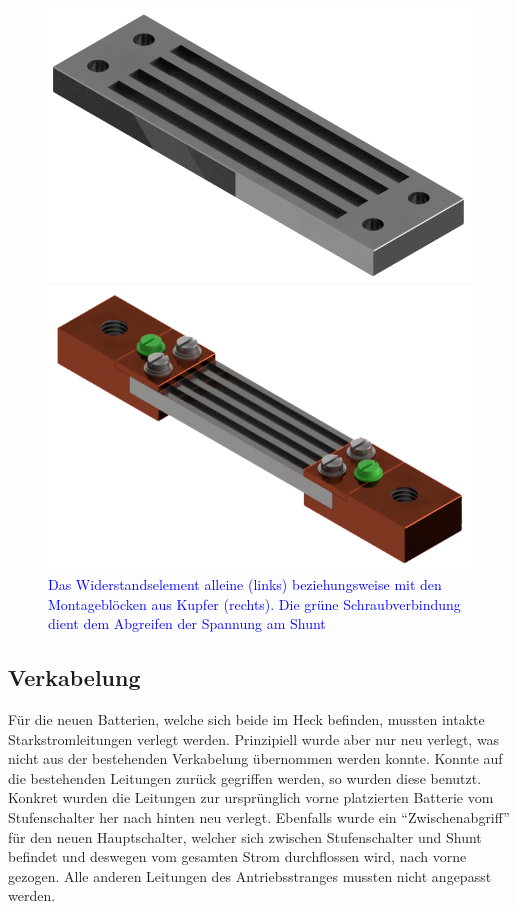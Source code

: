 \begin{figure}[h!]
\begin{minipage}{0.49\textwidth}
\includegraphics[width=\textwidth]{images/Shunt.png}
\end{minipage}\begin{minipage}{0.49\textwidth}
\includegraphics[width=\textwidth]{images/Shunt_komplett.png}
\end{minipage}
\caption{\textcolor{blue}{Das Widerstandselement alleine (links) beziehungsweise mit den Montageblöcken aus Kupfer (rechts). Die grüne Schraubverbindung dient dem Abgreifen der Spannung am Shunt}}%
\label{fig:shunt}%
\end{figure}

\subsection{Verkabelung}
Für die neuen Batterien, welche sich beide im Heck befinden, mussten intakte Starkstromleitungen verlegt werden. Prinzipiell wurde aber nur neu verlegt, was nicht aus der bestehenden Verkabelung übernommen werden konnte. Konnte auf die bestehenden Leitungen zurück gegriffen werden, so wurden diese benutzt. Konkret wurden die Leitungen zur ursprünglich vorne platzierten Batterie vom Stufenschalter her nach hinten neu verlegt. Ebenfalls wurde ein "`Zwischenabgriff"' für den neuen Hauptschalter, welcher sich zwischen Stufenschalter und Shunt befindet und deswegen vom gesamten Strom durchflossen wird, nach vorne gezogen. Alle anderen Leitungen des Antriebsstranges mussten nicht angepasst werden.

